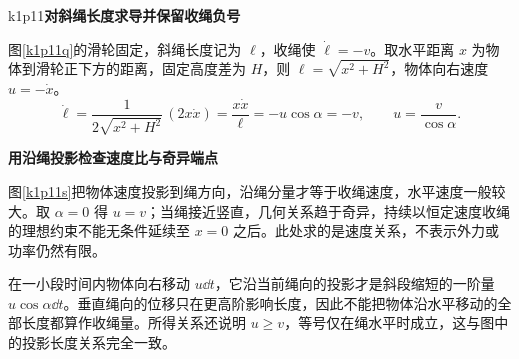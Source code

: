 \begin{drillsolution}{k1p11}\textbf{对斜绳长度求导并保留收绳负号}\par\nobreak
图\ref{k1p11q}的滑轮固定，斜绳长度记为 $\ell$，收绳使 $\dot\ell=-v$。取水平距离 $x$ 为物体到滑轮正下方的距离，固定高度差为 $H$，则 $\ell=\sqrt{x^2+H^2}$，物体向右速度 $u=-\dot x$。
\[\dot\ell=\frac1{2\sqrt{x^2+H^2}}\,(2x\dot x)
 =\frac{x\dot x}{\ell}=-u\cos\alpha=-v,
 \qquad\boxed{u=\frac v{\cos\alpha}}.\]



\par\medskip{}\noindent\textbf{用沿绳投影检查速度比与奇异端点}\par\nobreak
图\ref{k1p11s}把物体速度投影到绳方向，沿绳分量才等于收绳速度，水平速度一般较大。取 $\alpha=0$ 得 $u=v$；当绳接近竖直，几何关系趋于奇异，持续以恒定速度收绳的理想约束不能无条件延续至 $x=0$ 之后。此处求的是速度关系，不表示外力或功率仍然有限。

在一小段时间内物体向右移动 $u\dd t$，它沿当前绳向的投影才是斜段缩短的一阶量 $u\cos\alpha\dd t$。垂直绳向的位移只在更高阶影响长度，因此不能把物体沿水平移动的全部长度都算作收绳量。所得关系还说明 $u\ge v$，等号仅在绳水平时成立，这与图中的投影长度关系完全一致。\end{drillsolution}

